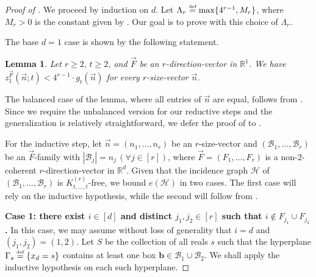 \documentclass[11pt]{article}
\newtheorem{lemma}[theorem]{Lemma}
\theoremstyle{definition}
\newcommand*{\eqdef}{\stackrel{\mbox{\normalfont\tiny def}}{=}} %
\newcommand*{\R}{\mathbb{R}}                                    %
\newcommand*{\cH}{\mathcal{H}}
\newcommand*{\vF}{\vec{F}}
\newcommand*{\cB}{\mathcal{B}}
\newcommand*{\vn}{\vec{n}}
\begin{document}
\begin{proof}[Proof of ]
    We proceed by induction on $d$. Let $\Lambda_r \eqdef \max\{4^{r-1}, M_r\}$, where $M_r > 0$ is the constant given by . Our goal is to prove  with this choice of $\Lambda_r$. 
    
    The base $d = 1$ case is shown by the following statement.

    \smallskip
    
    \begin{lemma} \label{lem:upper_onedim}
        Let $r \ge 2, \, t \ge 2$, and $\vF$ be an $r$-direction-vector in $\R^1$. We have $z_1^{\vF}(\vn; t) < 4^{r-1} \cdot g_t(\vn)$ for every $r$-size-vector $\vn$. 
    \end{lemma}
    
    The balanced case of the lemma, where all entries of $\vn$ are equal, follows from \cite[Proposition 8]{chan_keller_smorodinsky}. Since we require the unbalanced version for our reductive steps and the generalization is relatively straightforward, we defer the proof of  to . 

    \smallskip
    
    For the inductive step, let $\vn = (n_1, \dots, n_r)$ be an $r$-size-vector and $(\cB_1, \dots, \cB_r)$ be an $\vF$-family with $|\cB_j| = n_j \, (\forall j \in [r])$, where $\vF = (F_1, \dots, F_r)$ is a non-2-coherent $r$-direction-vector in $\mathbb{R}^d$. Given that the incidence graph $\cH$ of $(\cB_1, \dots, \cB_r)$ is $K_{t, \dots, t}^{(r)}$-free, we bound $e(\cH)$ in two cases. The first case will rely on the inductive hypothesis, while the second will follow from . 

    \medskip
    
    \noindent\textbf{Case 1: there exist $i \in [d]$ and distinct $j_1, j_2 \in [r]$ such that $i \notin F_{j_1} \cup F_{j_2}$.} In this case, we may assume without loss of generality that $i = d$ and $(j_1, j_2) = (1, 2)$. Let $S$ be the collection of all reals $s$ such that the hyperplane $\Gamma_s\eqdef \{x_d = s\}$ contains at least one box $\bm{b} \in \cB_1 \cup \cB_2$. We shall apply the inductive hypothesis on each such hyperplane. 
    

\end{proof}
\end{document}

